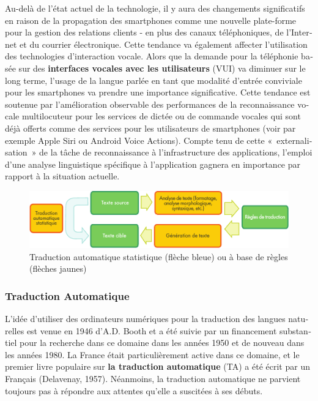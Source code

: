 \begin{french}
\begin{multicols}{2}
Au-delà de l'état actuel de la technologie, il y aura des
changements significatifs en raison de la propagation des smartphones
comme une nouvelle plate-forme pour la gestion des relations clients -
en plus des canaux téléphoniques, de l'Internet et du courrier
électronique. Cette tendance va également affecter l'utilisation des technologies d'interaction vocale. Alors
que la demande pour la téléphonie basée sur des {\bf interfaces
  vocales avec les utilisateurs} (VUI) va diminuer sur le long terme,
l'usage de la langue parlée en tant que modalité d'entrée conviviale pour les smartphones va prendre une importance
significative. Cette tendance est soutenue par l'amélioration
observable des performances de la reconnaissance vocale multilocuteur
pour les services de dictée ou de commande vocales qui sont déjà
offerts comme des services pour les utilisateurs de smartphones (voir
par exemple Apple Siri ou Android Voice Actions). Compte tenu de cette
«~externalisation~» de la tâche de reconnaissance à l'infrastructure des applications, l'emploi d'une
analyse linguistique spécifique à l'application gagnera en
importance par rapport à la situation actuelle.

\begin{figure}[t]
\begin{center}
 \includegraphics[width=\textwidth]{../_media/french/machine_translation}
\caption{Traduction automatique statistique (flèche bleue) ou à base de règles (flèches jaunes)}
\label{fig:mtarchi}
\end{center}
\end{figure}

\subsubsection{Traduction Automatique}
L'idée d'utiliser des ordinateurs numériques pour la traduction des
langues naturelles est venue en 1946 d'A.D. Booth et a été suivie par
un financement substantiel pour la recherche dans ce domaine dans les
années 1950 et de nouveau dans les années 1980. La France était
particulièrement active dans ce domaine, et le premier livre populaire
sur {\bf la traduction automatique} (TA) a été écrit par un Français
(Delavenay, 1957). Néanmoins, la traduction automatique ne
parvient toujours pas à répondre aux attentes qu'elle a suscitées à
ses débuts.


\end{multicols}
\end{french}
